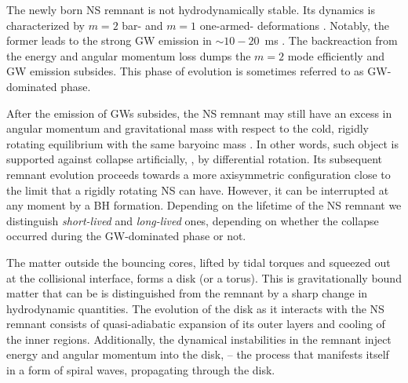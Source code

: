 The newly born \ac{NS} remnant is not hydrodynamically stable. 
Its dynamics is characterized by $m=2$ bar- and $m=1$ one-armed-
deformations \citep[\eg][]{Radice:2016gym}.
%
Notably, the former leads to the strong \ac{GW} emission 
in ${\sim}10-20$~ms \pmerg{}. The backreaction from the energy and angular momentum 
loss dumps the $m=2$ mode efficiently and \ac{GW} emission subsides. 
%
This phase of evolution is sometimes referred to as \ac{GW}-dominated \pmerg{} phase.


After the emission of \acp{GW} subsides, the \ac{NS} remnant may still have an excess 
in angular momentum and gravitational mass with respect to the cold, 
rigidly rotating equilibrium with the same baryoinc mass \citep{Radice:2018xqa}. 
In other words, such object is supported against collapse artificially, 
\eg, by differential rotation. 
%
Its subsequent remnant evolution proceeds towards a more axisymmetric configuration 
close to the limit that a rigidly rotating \ac{NS} can have.  
However, it can be interrupted at any moment by a \ac{BH} formation. %
Depending on the lifetime of the \ac{NS} remnant we distinguish \textit{short-lived}
and \textit{long-lived} ones, depending on whether the collapse occurred during the 
\ac{GW}-dominated phase or not. 


The matter outside the bouncing cores, lifted by tidal torques and squeezed out at the 
collisional interface, forms a disk (or a torus). 
%
This is gravitationally bound matter that can be is distinguished 
from the remnant by a sharp change in hydrodynamic quantities.
%
The evolution of the disk as it interacts with the \ac{NS} remnant consists of 
quasi-adiabatic expansion of its outer layers 
and cooling of the inner regions. 
%
Additionally, the dynamical instabilities in the remnant inject energy and 
angular momentum into the disk, -- the process that manifests itself in a 
form of spiral waves, propagating through the disk. 


